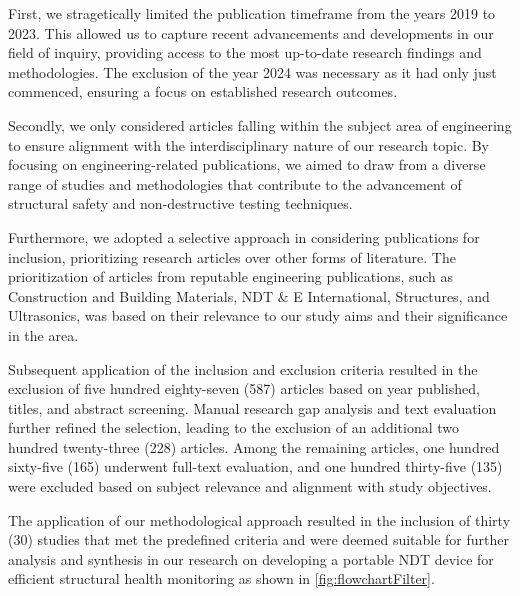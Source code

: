 \documentclass[journal, a4paper]{IEEEtran}
\begin{document}
First, we stragetically limited the publication timeframe from the years 2019 to 2023.
This allowed us to capture recent advancements and developments in our field of inquiry,
providing access to the most up-to-date research findings and methodologies.
The exclusion of the year 2024 was necessary as it had only just commenced, ensuring a focus on established research outcomes.

Secondly, we only considered articles falling within the subject area of engineering to ensure alignment with the
interdisciplinary nature of our research topic. By focusing on engineering-related publications, we aimed to draw
from a diverse range of studies and methodologies that contribute to the advancement of structural safety and non-destructive
testing techniques.

Furthermore, we adopted a selective approach in considering publications for inclusion, prioritizing research articles over
other forms of literature. The prioritization of articles from reputable engineering publications, such as Construction and
Building Materials, NDT \& E International, Structures, and Ultrasonics, was based on their relevance to our study aims and
their significance in the area.

Subsequent application of the inclusion and exclusion criteria resulted in the exclusion of
five hundred eighty-seven (587) articles based on year published, titles, and abstract screening.
Manual research gap analysis and text evaluation further refined the selection, leading to the exclusion of an
additional two hundred twenty-three (228) articles.
Among the remaining articles, one hundred sixty-five (165) underwent full-text evaluation,
and one hundred thirty-five (135) were excluded based on subject relevance and alignment with study objectives.

The application of our  methodological approach resulted in the inclusion of
thirty (30) studies that met the predefined criteria and were deemed suitable for further analysis and synthesis in our
research on developing a portable NDT device for efficient structural health monitoring as shown in \autoref{fig:flowchartFilter}.
\end{document}
